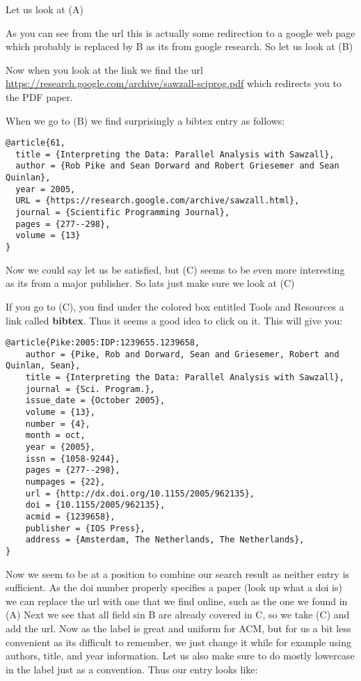 Let us look at (A)

As you can see from the url this is actually some redirection to a google
web page which probably is replaced by B as its from google research. So
let us look at (B)

Now when you look at the link we find the url
\url{https://research.google.com/archive/sawzall-sciprog.pdf} which
redirects you to the PDF paper.

When we go to (B) we find surprisingly a bibtex entry as follows:

\begin{verbatim}
@article{61,
  title = {Interpreting the Data: Parallel Analysis with Sawzall},
  author = {Rob Pike and Sean Dorward and Robert Griesemer and Sean Quinlan},
  year = 2005,
  URL = {https://research.google.com/archive/sawzall.html},
  journal = {Scientific Programming Journal},
  pages = {277--298},
  volume = {13}
}
\end{verbatim}

Now we could say let us be satisfied, but (C) seems to be even more
interesting as its from a major publisher. So lats just make sure we
look at (C)

If you go to (C), you find under the colored box entitled Tools and
Resources a link called \textbf{bibtex}. Thus it seems a good idea to
click on it. This will give you:

\begin{verbatim}
@article{Pike:2005:IDP:1239655.1239658,
    author = {Pike, Rob and Dorward, Sean and Griesemer, Robert and Quinlan, Sean},
    title = {Interpreting the Data: Parallel Analysis with Sawzall},
    journal = {Sci. Program.},
    issue_date = {October 2005},
    volume = {13},
    number = {4},
    month = oct,
    year = {2005},
    issn = {1058-9244},
    pages = {277--298},
    numpages = {22},
    url = {http://dx.doi.org/10.1155/2005/962135},
    doi = {10.1155/2005/962135},
    acmid = {1239658},
    publisher = {IOS Press},
    address = {Amsterdam, The Netherlands, The Netherlands},
}
\end{verbatim}

Now we seem to be at a position to combine our search result as neither
entry is sufficient. As the doi number properly specifies a paper (look
up what a doi is) we can replace the url with one that we find online,
such as the one we found in (A) Next we see that all field sin B are
already covered in C, so we take (C) and add the url. Now as the label is
great and uniform for ACM, but for us a bit less convenient as its
difficult to remember, we just change it while for example using
authors, title, and year information. Let us also make sure to do mostly
lowercase in the label just as a convention. Thus our entry looks like:

